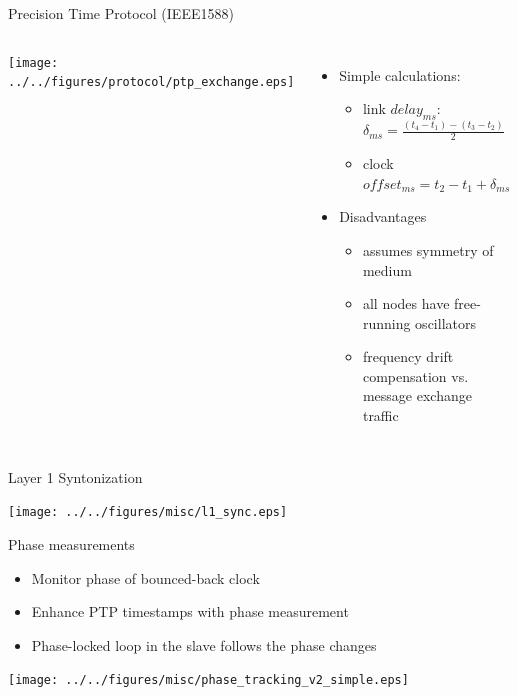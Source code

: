 \documentclass[compress,red]{beamer}
\begin{document}
\begin{frame}{Precision Time Protocol (IEEE1588)}

\begin{columns}[c]
  \column{1.2in}
  \begin{center}
    \texttt{[image: ../../figures/protocol/ptp\_exchange.eps]}
  \end{center}
  \column{3in}
    
  
  \begin{itemize}
    \item Simple calculations:
    \begin{itemize}
      \item link $delay_{ms}$: $\delta_{ms} = \frac{(t_{4}-t_{1}) - (t_{3}-t_{2})}{2}$
      \item clock $offset_{ms} = t_{2} - t_{1} + \delta_{ms}$
    \end{itemize}
   \item<2> Disadvantages
     \begin{itemize}
       \item assumes symmetry of medium
       \item all nodes have free-running oscillators
       \item frequency drift compensation vs. message exchange traffic
     \end{itemize}
   \end{itemize}
\end{columns}

\end{frame}

\begin{frame}{Layer 1 Syntonization}

  \begin{center}
    \texttt{[image: ../../figures/misc/l1\_sync.eps]}
  \end{center}
\end{frame}

\begin{frame}{Phase measurements}

  \begin{itemize}
    \item Monitor phase of bounced-back clock
    \item Enhance PTP timestamps with phase measurement
    \item Phase-locked loop in the slave follows the phase changes  
  \end{itemize}

  \begin{center}
    \texttt{[image: ../../figures/misc/phase\_tracking\_v2\_simple.eps]}
  \end{center}

\end{frame}
\end{document}

